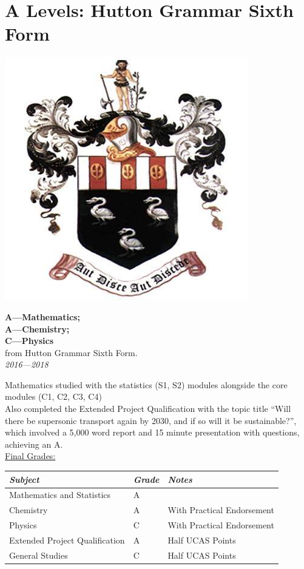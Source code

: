\documentclass[9pt,a4paper]{article}
\begin{document}
\section{A Levels: Hutton Grammar Sixth Form}
\begin{center}
	\includegraphics[height=0.15\textheight]{hgs.jpg}
\end{center}
\begin{center}
	\noindent\textbf{A---Mathematics; \\A---Chemistry; \\C---Physics}\\
	\noindent from Hutton Grammar Sixth Form.\\
	\noindent\emph{2016---2018}
\end{center}

Mathematics studied with the statistics (S1, S2) modules alongside the core modules (C1, C2, C3, C4)\\
Also completed the Extended Project Qualification with the topic title ``Will there be supersonic transport again by 2030, and if so will it be sustainable?'', which involved a 5,000 word report and 15 minute presentation with questions, achieving an A.
 \\\linebreak
\underline{Final Grades:}\\
\begin{tabular}{p{5.2cm}|p{1.1cm}|p{4.5cm}}
	\emph{Subject}&\emph{Grade}&\emph{Notes}\\\hline\hline
	Mathematics and Statistics & A & \\
	Chemistry & A &With Practical Endorsement\\
	Physics & C &With Practical Endorsement \\
	Extended Project Qualification & A & Half UCAS Points\\
	General Studies & C & Half UCAS Points
\end{tabular}
\end{document}
